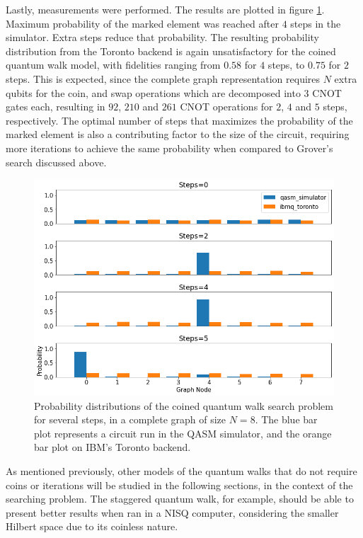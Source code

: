 \documentclass[../../dissertation.tex]{subfiles}
\begin{document}
Lastly, measurements were performed. The results are plotted in figure
\ref{fig:coinedSearchQiskitDist}. Maximum probability of the marked element was
reached after $4$ steps in the simulator. Extra steps reduce that probability.
The resulting probability distribution from the Toronto backend is again
unsatisfactory for the coined quantum walk model, with fidelities ranging from
$0.58$ for $4$ steps, to $0.75$ for $2$ steps. This is expected, since the
complete graph representation requires $N$ extra qubits for the coin, and swap
operations which are decomposed into $3$ CNOT gates each, resulting in $92$, $210$ and $261$ CNOT operations for $2$, $4$ and $5$ steps, respectively. The optimal number of
steps that maximizes the probability of the marked element is also a
contributing factor to the size of the circuit, requiring more iterations to
achieve the same probability when compared to Grover's search discussed above. 
\begin{figure}[!h]
	\centering
	\includegraphics[scale=0.40]{img/Qiskit/CoinedQuantumWalk/Search/CoinedQiskitSearch_N3_M4_S0245}
	\caption{Probability distributions of the coined quantum walk search problem for several steps, in a complete graph of size $N=8$. The blue bar plot represents a circuit run in the QASM simulator, and the orange bar plot on IBM's Toronto backend.} 
	\label{fig:coinedSearchQiskitDist}
\end{figure}\par

As mentioned previously, other models of the quantum walks that do not require
coins or iterations will be studied in the following sections, in the context
of the searching problem. The staggered quantum walk, for example, should be
able to present better results when ran in a NISQ computer, considering the
smaller Hilbert space due to its coinless nature.
\end{document}
